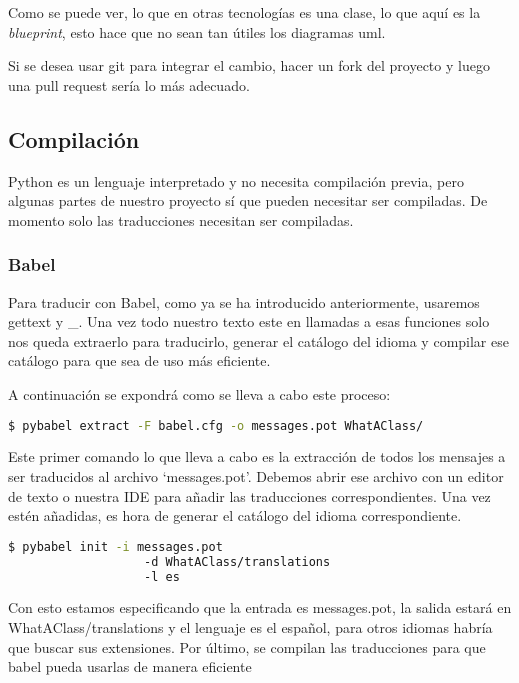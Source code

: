 Como se puede ver, lo que en otras tecnologías es una clase, lo que aquí es la \emph{blueprint}, esto hace que no sean tan útiles los diagramas uml.

Si se desea usar git para integrar el cambio, hacer un fork del proyecto y luego una pull request sería lo más adecuado. 


\subsection{Compilación}

Python es un lenguaje interpretado y no necesita compilación previa, pero algunas partes de nuestro proyecto sí que pueden necesitar ser compiladas. De momento solo las traducciones necesitan ser compiladas.

\subsubsection{Babel}

Para traducir con Babel, como ya se ha introducido anteriormente, usaremos gettext y \_. Una vez todo nuestro texto este en llamadas a esas funciones solo nos queda extraerlo para traducirlo, generar el catálogo del idioma y compilar ese catálogo para que sea de uso más eficiente.

A continuación se expondrá como se lleva a cabo este proceso:

\lstset{style=linestyle}
\begin{lstlisting}[language=bash]
    $ pybabel extract -F babel.cfg -o messages.pot WhatAClass/
\end{lstlisting}

Este primer comando lo que lleva a cabo es la extracción de todos los mensajes a ser traducidos al archivo `messages.pot'. Debemos abrir ese archivo con un editor de texto o nuestra IDE para añadir las traducciones correspondientes. Una vez estén añadidas, es hora de generar el catálogo del idioma correspondiente. 

\begin{lstlisting}[language=bash]
    $ pybabel init -i messages.pot 
                   -d WhatAClass/translations 
                   -l es
\end{lstlisting}

Con esto estamos especificando que la entrada es messages.pot, la salida estará en WhatAClass/translations y el lenguaje es el español, para otros idiomas habría que buscar sus extensiones. Por último, se compilan las traducciones para que babel pueda usarlas de manera eficiente

